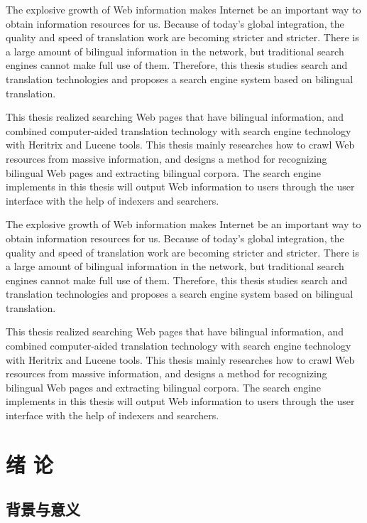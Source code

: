 \documentclass{swjtuthesis}
\begin{document}
\begin{enabstract}
    The explosive growth of Web information makes Internet be an important way to obtain information resources for us. Because of today’s global integration, the quality and speed of translation work are becoming stricter and stricter. There is a large amount of bilingual information in the network, but traditional search engines cannot make full use of them. Therefore, this thesis studies search and translation technologies and proposes a search engine system based on bilingual translation.

    This thesis realized searching Web pages that have bilingual information, and combined computer-aided translation technology with search engine technology with Heritrix and Lucene tools. This thesis mainly researches how to crawl Web resources from massive information, and designs a method for recognizing bilingual Web pages and extracting bilingual corpora. The search engine implements in this thesis will output Web information to users through the user interface with the help of indexers and searchers.

    The explosive growth of Web information makes Internet be an important way to obtain information resources for us. Because of today’s global integration, the quality and speed of translation work are becoming stricter and stricter. There is a large amount of bilingual information in the network, but traditional search engines cannot make full use of them. Therefore, this thesis studies search and translation technologies and proposes a search engine system based on bilingual translation.

    This thesis realized searching Web pages that have bilingual information, and combined computer-aided translation technology with search engine technology with Heritrix and Lucene tools. This thesis mainly researches how to crawl Web resources from massive information, and designs a method for recognizing bilingual Web pages and extracting bilingual corpora. The search engine implements in this thesis will output Web information to users through the user interface with the help of indexers and searchers.
\end{enabstract}

\maketot

\startmainmatter

\chapter{绪 论}
\section{背景与意义}
\end{document}
